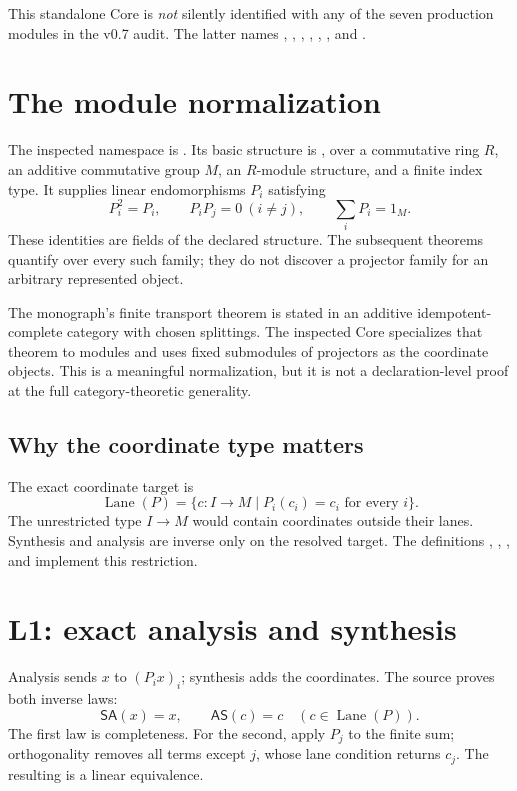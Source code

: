 \documentclass[11pt]{article}
\begin{document}
This standalone Core is \emph{not} silently identified with any of the seven
production modules in the v0.7 audit. The latter names
\texttt{}, \texttt{}, \texttt{},
\texttt{}, \texttt{},
\texttt{}, and \texttt{}.

\section{The module normalization}
The inspected namespace is
\texttt{}. Its basic structure is
\texttt{}, over a commutative ring \(R\), an additive
commutative group \(M\), an \(R\)-module structure, and a finite index type.
It supplies linear endomorphisms \(P_i\) satisfying
\[
 P_i^2=P_i,\qquad P_iP_j=0\ (i\ne j),\qquad \sum_iP_i=1_M.
\]
These identities are fields of the declared structure. The subsequent
theorems quantify over every such family; they do not discover a projector
family for an arbitrary represented object.

The monograph's finite transport theorem is stated in an additive
idempotent-complete category with chosen splittings. The inspected Core
specializes that theorem to modules and uses fixed submodules of projectors
as the coordinate objects. This is a meaningful normalization, but it is
not a declaration-level proof at the full category-theoretic generality.

\subsection{Why the coordinate type matters}
The exact coordinate target is
\[
 \operatorname{Lane}(P)
 =\{c:I\to M\mid P_i(c_i)=c_i\text{ for every }i\}.
\]
The unrestricted type \(I\to M\) would contain coordinates outside their
lanes. Synthesis and analysis are inverse only on the resolved target.
The definitions \texttt{}, \texttt{},
\texttt{}, and \texttt{} implement this restriction.

\section{L1: exact analysis and synthesis}
Analysis sends \(x\) to \((P_ix)_i\); synthesis adds the coordinates.
The source proves both inverse laws:
\[
 \mathsf S\mathsf A(x)=x,\qquad
 \mathsf A\mathsf S(c)=c\quad(c\in\operatorname{Lane}(P)).
\]
The first law is completeness. For the second, apply \(P_j\) to the finite
sum; orthogonality removes all terms except \(j\), whose lane condition
returns \(c_j\). The resulting \texttt{} is a linear equivalence.
\end{document}
